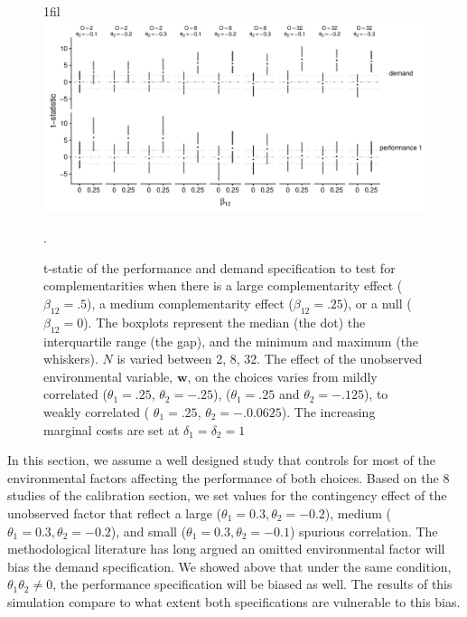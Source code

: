\documentclass[12pt]{article}
\makeatletter
\newcommand*{\centerfloat}{%
  \parindent \z@
  \leftskip \z@ \@plus 1fil \@minus \textwidth
  \rightskip\leftskip
  \parfillskip \z@skip}
\makeatother
\begin{document}
\begin{figure}
\centerfloat
\includegraphics[width=550px]{figure-latex/spurious_plot.pdf}
\caption[Error Rate and Power with Unobserved Environmental Variables]
{\label{spurious} t-static of the performance and demand specification to test
for complementarities when there is a large complementarity effect
($\beta_{12} = .5$), a medium complementarity effect ($\beta_{12} = .25$),
or a null ($\beta_{12} = 0$). The boxplots represent the median (the dot) the
interquartile range (the gap), and the minimum and maximum (the whiskers). $N$
is varied between 2, 8, 32. The effect of the unobserved environmental variable,
$\mathbf{w}$, on the choices varies from mildly correlated ($\theta_1 = .25$,
$\theta_2 = -.25$), ($\theta_1 = .25$ and $\theta_2 = -.125$),
to weakly correlated ( $\theta_1 =.25$, $\theta_2 = -.0.0625$). The increasing
marginal costs are set at $\delta_1 = \delta_2 = 1$}.
\end{figure}



In this section, we assume a well designed study that controls for most of the environmental factors affecting the performance of both choices. Based on the 8 studies of the calibration section, we set values for the contingency effect of the unobserved factor that reflect a large ($\theta_1 = 0.3, \theta_2 = -0.2$), medium ($\theta_1 = 0.3, \theta_2 = -0.2$), and small ($\theta_1 = 0.3, \theta_2 = -0.1$) spurious correlation. The methodological literature has long argued an omitted environmental factor will bias the demand specification. We showed above that under the same condition, $\theta_1 \theta_2 \neq 0$, the performance specification will be biased as well. The results of this simulation compare to what extent both specifications are vulnerable to this bias.
\end{document}
